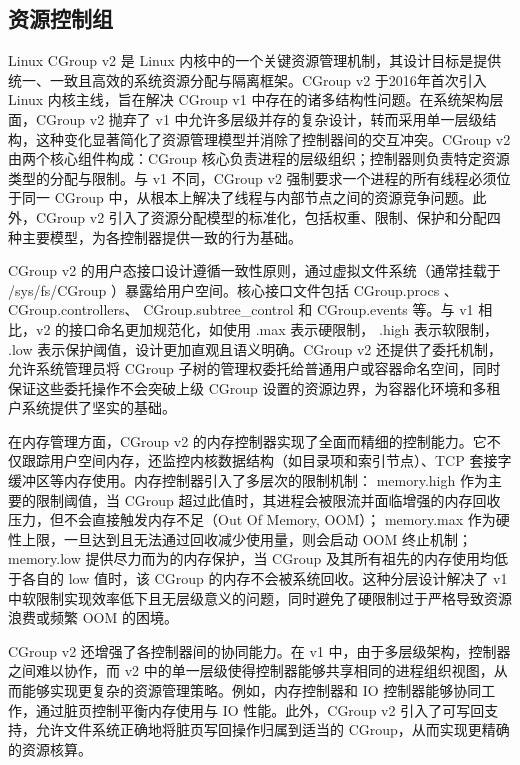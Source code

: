 \subsection{资源控制组}

Linux CGroup v2 是 Linux 内核中的一个关键资源管理机制，其设计目标是提供统一、一致且高效的系统资源分配与隔离框架。CGroup v2 于2016年首次引入 Linux 内核主线，旨在解决 CGroup v1 中存在的诸多结构性问题。在系统架构层面，CGroup v2 抛弃了 v1 中允许多层级并存的复杂设计，转而采用单一层级结构，这种变化显著简化了资源管理模型并消除了控制器间的交互冲突。CGroup v2 由两个核心组件构成：CGroup 核心负责进程的层级组织；控制器则负责特定资源类型的分配与限制。与 v1 不同，CGroup v2 强制要求一个进程的所有线程必须位于同一 CGroup 中，从根本上解决了线程与内部节点之间的资源竞争问题。此外，CGroup v2 引入了资源分配模型的标准化，包括权重、限制、保护和分配四种主要模型，为各控制器提供一致的行为基础。

CGroup v2 的用户态接口设计遵循一致性原则，通过虚拟文件系统（通常挂载于 /sys/fs/CGroup ）暴露给用户空间。核心接口文件包括 CGroup.procs 、 CGroup.controllers、 CGroup.subtree\_control 和 CGroup.events 等。与 v1 相比，v2 的接口命名更加规范化，如使用 .max 表示硬限制， .high 表示软限制， .low 表示保护阈值，设计更加直观且语义明确。CGroup v2 还提供了委托机制，允许系统管理员将 CGroup 子树的管理权委托给普通用户或容器命名空间，同时保证这些委托操作不会突破上级 CGroup 设置的资源边界，为容器化环境和多租户系统提供了坚实的基础。

在内存管理方面，CGroup v2 的内存控制器实现了全面而精细的控制能力。它不仅跟踪用户空间内存，还监控内核数据结构（如目录项和索引节点）、TCP 套接字缓冲区等内存使用。内存控制器引入了多层次的限制机制： memory.high 作为主要的限制阈值，当 CGroup 超过此值时，其进程会被限流并面临增强的内存回收压力，但不会直接触发内存不足（Out Of Memory, OOM）； memory.max 作为硬性上限，一旦达到且无法通过回收减少使用量，则会启动 OOM 终止机制； memory.low 提供尽力而为的内存保护，当 CGroup 及其所有祖先的内存使用均低于各自的 low 值时，该 CGroup 的内存不会被系统回收。这种分层设计解决了 v1 中软限制实现效率低下且无层级意义的问题，同时避免了硬限制过于严格导致资源浪费或频繁 OOM 的困境。

CGroup v2 还增强了各控制器间的协同能力。在 v1 中，由于多层级架构，控制器之间难以协作，而 v2 中的单一层级使得控制器能够共享相同的进程组织视图，从而能够实现更复杂的资源管理策略。例如，内存控制器和 IO 控制器能够协同工作，通过脏页控制平衡内存使用与 IO 性能。此外，CGroup v2 引入了可写回支持，允许文件系统正确地将脏页写回操作归属到适当的 CGroup，从而实现更精确的资源核算。

